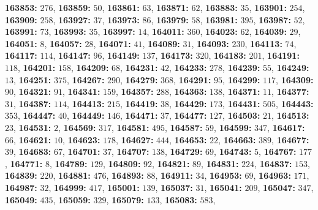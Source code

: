 \textsf{\bfseries 163853:} $276$, \textsf{\bfseries 163859:} $50$, \textsf{\bfseries 163861:} $63$, \textsf{\bfseries 163871:} $62$, \textsf{\bfseries 163883:} $35$, \textsf{\bfseries 163901:} $254$, \textsf{\bfseries 163909:} $258$, \textsf{\bfseries 163927:} $37$, \textsf{\bfseries 163973:} $86$, \textsf{\bfseries 163979:} $58$, \textsf{\bfseries 163981:} $395$, \textsf{\bfseries 163987:} $52$, \textsf{\bfseries 163991:} $73$, \textsf{\bfseries 163993:} $35$, \textsf{\bfseries 163997:} $14$, \textsf{\bfseries 164011:} $360$, \textsf{\bfseries 164023:} $62$, \textsf{\bfseries 164039:} $29$, \textsf{\bfseries 164051:} $8$, \textsf{\bfseries 164057:} $28$, \textsf{\bfseries 164071:} $41$, \textsf{\bfseries 164089:} $31$, \textsf{\bfseries 164093:} $230$, \textsf{\bfseries 164113:} $74$, \textsf{\bfseries 164117:} $114$, \textsf{\bfseries 164147:} $96$, \textsf{\bfseries 164149:} $137$, \textsf{\bfseries 164173:} $320$, \textsf{\bfseries 164183:} $201$, \textsf{\bfseries 164191:} $118$, \textsf{\bfseries 164201:} $158$, \textsf{\bfseries 164209:} $68$, \textsf{\bfseries 164231:} $42$, \textsf{\bfseries 164233:} $278$, \textsf{\bfseries 164239:} $55$, \textsf{\bfseries 164249:} $13$, \textsf{\bfseries 164251:} $375$, \textsf{\bfseries 164267:} $290$, \textsf{\bfseries 164279:} $368$, \textsf{\bfseries 164291:} $95$, \textsf{\bfseries 164299:} $117$, \textsf{\bfseries 164309:} $90$, \textsf{\bfseries 164321:} $91$, \textsf{\bfseries 164341:} $159$, \textsf{\bfseries 164357:} $288$, \textsf{\bfseries 164363:} $138$, \textsf{\bfseries 164371:} $11$, \textsf{\bfseries 164377:} $31$, \textsf{\bfseries 164387:} $114$, \textsf{\bfseries 164413:} $215$, \textsf{\bfseries 164419:} $38$, \textsf{\bfseries 164429:} $173$, \textsf{\bfseries 164431:} $505$, \textsf{\bfseries 164443:} $353$, \textsf{\bfseries 164447:} $40$, \textsf{\bfseries 164449:} $146$, \textsf{\bfseries 164471:} $37$, \textsf{\bfseries 164477:} $127$, \textsf{\bfseries 164503:} $21$, \textsf{\bfseries 164513:} $23$, \textsf{\bfseries 164531:} $2$, \textsf{\bfseries 164569:} $317$, \textsf{\bfseries 164581:} $495$, \textsf{\bfseries 164587:} $59$, \textsf{\bfseries 164599:} $347$, \textsf{\bfseries 164617:} $66$, \textsf{\bfseries 164621:} $10$, \textsf{\bfseries 164623:} $178$, \textsf{\bfseries 164627:} $444$, \textsf{\bfseries 164653:} $22$, \textsf{\bfseries 164663:} $389$, \textsf{\bfseries 164677:} $39$, \textsf{\bfseries 164683:} $67$, \textsf{\bfseries 164701:} $37$, \textsf{\bfseries 164707:} $138$, \textsf{\bfseries 164729:} $69$, \textsf{\bfseries 164743:} $5$, \textsf{\bfseries 164767:} $177$, \textsf{\bfseries 164771:} $8$, \textsf{\bfseries 164789:} $129$, \textsf{\bfseries 164809:} $92$, \textsf{\bfseries 164821:} $89$, \textsf{\bfseries 164831:} $224$, \textsf{\bfseries 164837:} $153$, \textsf{\bfseries 164839:} $220$, \textsf{\bfseries 164881:} $476$, \textsf{\bfseries 164893:} $88$, \textsf{\bfseries 164911:} $34$, \textsf{\bfseries 164953:} $69$, \textsf{\bfseries 164963:} $171$, \textsf{\bfseries 164987:} $32$, \textsf{\bfseries 164999:} $417$, \textsf{\bfseries 165001:} $139$, \textsf{\bfseries 165037:} $31$, \textsf{\bfseries 165041:} $209$, \textsf{\bfseries 165047:} $347$, \textsf{\bfseries 165049:} $435$, \textsf{\bfseries 165059:} $329$, \textsf{\bfseries 165079:} $133$, \textsf{\bfseries 165083:} $583$, 
